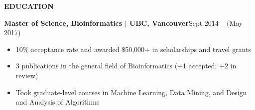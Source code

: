\documentclass{res}
\renewcommand{\section}[1]{%
  \vspace{0.3in}%
  \centerline{\uppercase{\bf{#1}}}%
  \vspace{-6pt}}
\begin{document}
\begin{resume}
\vspace{-1em}
\section{Education}
{\bf Master of Science, Bioinformatics $|$ UBC, Vancouver}\hfill{Sept 2014 -- (May 2017)}
\begin{itemize}
  \item 10\% acceptance rate and awarded \$50,000+ in scholarships and travel grants
  \item 3 publications in the general field of Bioinformatics (+1 accepted; +2 in review)
  \item Took graduate-level courses in Machine Learning, Data Mining, and Design and Analysis of Algorithms
\end{itemize}
\pagebreak

\end{resume}
\end{document}
